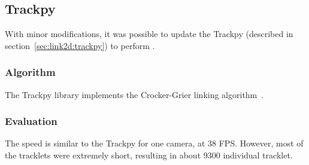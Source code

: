 \subsection{Trackpy}
\label{sec:link3d:trackpy}

With minor modifications, it was possible to update the Trackpy \linkDD* (described in section~\ref{sec:link2d:trackpy}) to perform \linkDDD*.

\subsubsection{Algorithm}

The Trackpy library implements the Crocker-Grier linking algorithm~\cite{trackpy-link}.

\subsubsection{Evaluation}

The speed is similar to the Trackpy \linkDD* for one camera, at 38 FPS.
However, most of the tracklets were extremely short, resulting in about 9300 individual tracklet.
